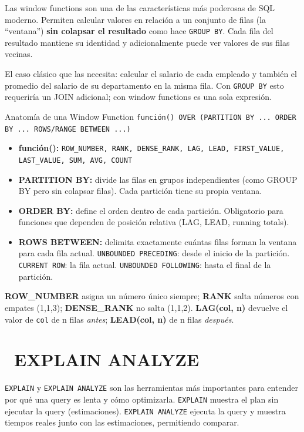 Las window functions son una de las características más poderosas de SQL moderno.
Permiten calcular valores en relación a un conjunto de filas (la ``ventana'') \textbf{sin colapsar el resultado} como hace \texttt{GROUP BY}.
Cada fila del resultado mantiene su identidad y adicionalmente puede ver valores de sus filas vecinas.

El caso clásico que las necesita: calcular el salario de cada empleado y también el promedio del salario de su departamento en la misma fila.
Con \texttt{GROUP BY} esto requeriría un JOIN adicional; con window functions es una sola expresión.

\begin{teoriabox}{Anatomía de una Window Function}
\texttt{función() OVER (PARTITION BY ... ORDER BY ... ROWS/RANGE BETWEEN ...)}
\begin{itemize}
  \item \textbf{función():} \texttt{ROW\_NUMBER, RANK, DENSE\_RANK, LAG, LEAD, FIRST\_VALUE, LAST\_VALUE, SUM, AVG, COUNT}
  \item \textbf{PARTITION BY:} divide las filas en grupos independientes (como GROUP BY pero sin colapsar filas). Cada partición tiene su propia ventana.
  \item \textbf{ORDER BY:} define el orden dentro de cada partición. Obligatorio para funciones que dependen de posición relativa (LAG, LEAD, running totals).
  \item \textbf{ROWS BETWEEN:} delimita exactamente cuántas filas forman la ventana para cada fila actual.
    \texttt{UNBOUNDED PRECEDING}: desde el inicio de la partición.
    \texttt{CURRENT ROW}: la fila actual.
    \texttt{UNBOUNDED FOLLOWING}: hasta el final de la partición.
\end{itemize}
\textbf{ROW\_NUMBER} asigna un número único siempre; \textbf{RANK} salta números con empates (1,1,3); \textbf{DENSE\_RANK} no salta (1,1,2).
\textbf{LAG(col, n)} devuelve el valor de \texttt{col} de n filas \emph{antes}; \textbf{LEAD(col, n)} de n filas \emph{después}.
\end{teoriabox}

\section[EXPLAIN ANALYZE]{~EXPLAIN ANALYZE}

\texttt{EXPLAIN} y \texttt{EXPLAIN ANALYZE} son las herramientas más importantes para entender por qué una query es lenta y cómo optimizarla.
\texttt{EXPLAIN} muestra el plan sin ejecutar la query (estimaciones).
\texttt{EXPLAIN ANALYZE} ejecuta la query y muestra tiempos reales junto con las estimaciones, permitiendo comparar.

